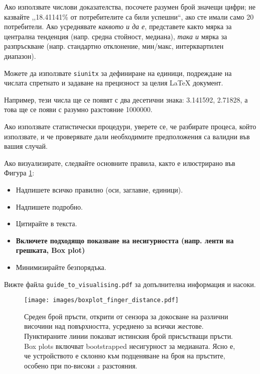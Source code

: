 Ако използвате числови доказателства, посочете разумен брой значещи цифри; не казвайте ,,18.41141\% от потребителите са били успешни``, ако сте имали само 20 потребители. Ако усреднявате \textit{каквото и да е}, представете както мярка за централна тенденция (напр. средна стойност, медиана), \textit{така и} мярка за разпръскване (напр. стандартно отклонение, мин/макс, интерквартилен диапазон).

Можете да използвате \texttt{siunitx} за дефиниране на единици, подреждане на числата спретнато и задаване на прецизност за целия LaTeX документ. 


Например, тези числа ще се появят с два десетични знака: \num{3.141592}, \num{2.71828}, а това ще се появи с разумно разстояние \num{1000000}.

Ако използвате статистически процедури, уверете се, че разбирате процеса, който използвате,
и че проверявате дали необходимите предположения са валидни във вашия случай. 

Ако визуализирате, следвайте основните правила, както е илюстрирано във Фигура \cref{fig:boxplot}:
\begin{itemize}
\item Надпишете всичко правилно (оси, заглавие, единици).
\item Надпишете подробно.
\item Цитирайте в текста.
\item \textbf{Включете подходящо показване на несигурността (напр. ленти на грешката, Box plot)}
\item Минимизирайте безпорядъка.
\end{itemize}

Вижте файла \texttt{guide\_to\_visualising.pdf} за допълнителна информация и насоки.

\begin{figure}[htb]
    \centering
    \texttt{[image: images/boxplot\_finger\_distance.pdf]}    

    \caption{Среден брой пръсти, открити от сензора за докосване на различни височини над повърхността, усреднено за всички жестове. Пунктираните линии показват
    истинския брой присъстващи пръсти. Box plots включват bootstrapped несигурност за медианата. Ясно е, че устройството е склонно към
    подценяване на броя на пръстите, особено при по-високи $z$ разстояния.
    }

    \label{fig:boxplot} 
\end{figure}

